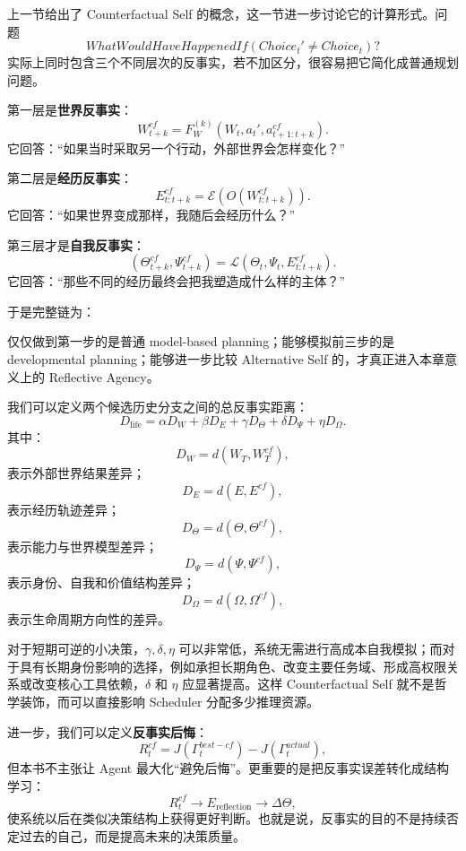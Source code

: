 上一节给出了 Counterfactual Self 的概念，这一节进一步讨论它的计算形式。问题
\[
\boxed{
WhatWouldHaveHappenedIf
\left(
Choice_t'\neq Choice_t
\right)?
}
\]
实际上同时包含三个不同层次的反事实，若不加区分，很容易把它简化成普通规划问题。

第一层是\textbf{世界反事实}：
\[
W_{t+k}^{cf}
=
F_W^{(k)}
\left(
W_t,
a_t',
a_{t+1:t+k}^{cf}
\right).
\]
它回答：“如果当时采取另一个行动，外部世界会怎样变化？”

第二层是\textbf{经历反事实}：
\[
E_{t:t+k}^{cf}
=
\mathcal E
\left(
O(W_{t:t+k}^{cf})
\right).
\]
它回答：“如果世界变成那样，我随后会经历什么？”

第三层才是\textbf{自我反事实}：
\[
(\Theta_{t+k}^{cf},\Psi_{t+k}^{cf})
=
\mathcal L
\left(
\Theta_t,\Psi_t,E_{t:t+k}^{cf}
\right).
\]
它回答：“那些不同的经历最终会把我塑造成什么样的主体？”

于是完整链为：
\begin{statementbox}
\centering
{}
\end{statementbox}
仅仅做到第一步的是普通 model-based planning；能够模拟前三步的是 developmental planning；能够进一步比较 Alternative Self 的，才真正进入本章意义上的 Reflective Agency。

我们可以定义两个候选历史分支之间的总反事实距离：
\[
D_{\mathrm{life}}
=
\alpha D_W
+
\beta D_E
+
\gamma D_\Theta
+
\delta D_\Psi
+
\eta D_\Omega.
\]
其中：
\[
D_W=d(W_T,W_T^{cf}),
\]
表示外部世界结果差异；
\[
D_E=d(E,E^{cf}),
\]
表示经历轨迹差异；
\[
D_\Theta=d(\Theta,\Theta^{cf}),
\]
表示能力与世界模型差异；
\[
D_\Psi=d(\Psi,\Psi^{cf}),
\]
表示身份、自我和价值结构差异；
\[
D_\Omega=d(\Omega,\Omega^{cf}),
\]
表示生命周期方向性的差异。

对于短期可逆的小决策，$\gamma,\delta,\eta$ 可以非常低，系统无需进行高成本自我模拟；而对于具有长期身份影响的选择，例如承担长期角色、改变主要任务域、形成高权限关系或改变核心工具依赖，$\delta$ 和 $\eta$ 应显著提高。这样 Counterfactual Self 就不是哲学装饰，而可以直接影响 Scheduler 分配多少推理资源。

进一步，我们可以定义\textbf{反事实后悔}：
\[
R_t^{cf}
=
J(\Gamma_t^{best-cf})
-
J(\Gamma_t^{actual}),
\]
但本书不主张让 Agent 最大化“避免后悔”。更重要的是把反事实误差转化成结构学习：
\[
R_t^{cf}
\rightarrow
E_{\mathrm{reflection}}
\rightarrow
\Delta\Theta,
\]
使系统以后在类似决策结构上获得更好判断。也就是说，反事实的目的不是持续否定过去的自己，而是提高未来的决策质量。

